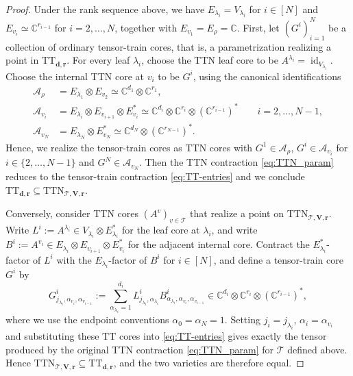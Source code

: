\documentclass[10pt,a4paper]{amsart}
\newcommand{\CC}{\mathbb{C}}
\begin{document}
\begin{proof}
Under the rank sequence above, we have $E_{\lambda_i}=V_{\lambda_i}$ for $i \in [N]$ and $E_{v_i}\simeq\mathbb C^{r_{i-1}}$ for $i=2,\ldots,N$, together with $E_{v_1}=E_\rho=\mathbb C$.
First, let $(G^i)_{i=1}^N$ be a collection of ordinary tensor-train
cores, that is, a parametrization realizing a point in $\mathrm{TT}_{\mathbf{d}, \mathbf{r}}$. For every leaf $\lambda_i$, choose the TTN leaf core to be $A^{\lambda_i}
=
\operatorname{id}_{V_{\lambda_i}}.$
Choose the internal TTN core at $v_i$ to be $G^i$, using the
canonical identifications
$$
\begin{aligned}
\mathcal A_\rho
&=
E_{\lambda_1}\otimes E_{v_2}
\simeq
\CC^{d_1}\otimes\mathbb C^{r_1},\\
\mathcal A_{v_i}
&=
E_{\lambda_i}\otimes E_{v_{i+1}}\otimes E_{v_i}^*
\simeq
\CC^{d_i}
\otimes
\mathbb C^{r_i}
\otimes
(\mathbb C^{r_{i-1}})^* \quad \quad i=2,\ldots, N-1,\\
\mathcal A_{v_N}
&=
E_{\lambda_N}\otimes E_{v_N}^*
\simeq
\CC^{d_N}\otimes(\mathbb C^{r_{N-1}})^*.
\end{aligned}
$$
Hence, we realize the tensor-train cores as TTN cores with $G^1 \in \mathcal A_\rho$, $G^i \in \mathcal A_{v_i}$ for $i \in \{2,\ldots, N-1\}$ and $G^N \in \mathcal A_{v_N}$.
Then the TTN contraction \eqref{eq:TTN_param} reduces to the
tensor-train contraction \eqref{eq:TT-entries} and we conclude 
$
\mathrm{TT}_{\mathbf d,\mathbf r}
\subseteq
\mathrm{TTN}_{\mathscr T,\mathbf V,\mathbf r}$.

Conversely, consider TTN cores $(A^v)_{v\in\mathscr{T}}$ that realize a point on $\mathrm{TTN}_{\mathscr T,\mathbf V,\mathbf r}$. Write
$
L^i:=A^{\lambda_i}
\in
V_{\lambda_i}\otimes E_{\lambda_i}^*$
for the leaf core at $\lambda_i$, and write 
$ B^i:=A^{v_i} \in E_{\lambda_i}\otimes E_{v_{i+1}}\otimes E_{v_i}^*
$
for the adjacent internal core. Contract the
$E_{\lambda_i}^*$-factor of $L^i$ with the
$E_{\lambda_i}$-factor of $B^i$ for $i \in [N]$, and define a 
tensor-train core $G^i$ by
\[
G^i_{j_{\lambda_i},\alpha_{v_i},\alpha_{v_{i-1}}}
:=
\sum_{\alpha_{\lambda_i}=1}^{d_i}
L^i_{j_{\lambda_i},\alpha_{\lambda_i}}
B^i_{\alpha_{\lambda_i},\alpha_{v_i},\alpha_{v_{i-1}}} \in
\CC^{d_i}
\otimes
\mathbb C^{r_i}
\otimes
(\mathbb C^{r_{i-1}})^*,
\]
where we use the endpoint conventions $\alpha_0=\alpha_N=1.$
Setting $j_i = j_{\lambda_i}$, $\alpha_i = \alpha_{v_i}$ and substituting these $\mathrm{TT}$ cores into
\eqref{eq:TT-entries} gives exactly the tensor produced by the
original TTN contraction \eqref{eq:TTN_param} for $\mathscr{T}$ defined above. Hence
$
\mathrm{TTN}_{\mathscr T,\mathbf V,\mathbf r}
\subseteq
\mathrm{TT}_{\mathbf d,\mathbf r}$, and
the two varieties are therefore equal.
\end{proof}
\end{document}
